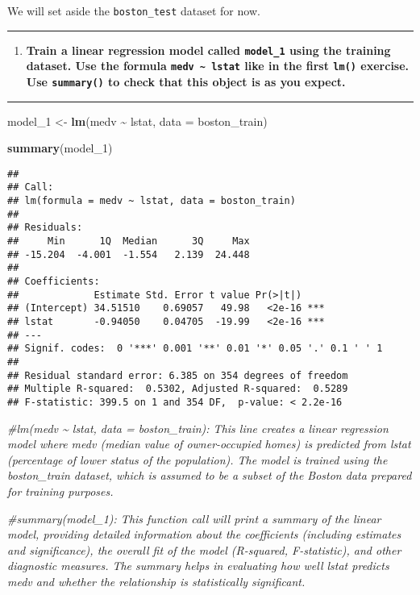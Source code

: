\documentclass[
  12pt,
]{article}
\newenvironment{Shaded}{\begin{snugshade}}{\end{snugshade}}
\newcommand{\AttributeTok}[1]{\textcolor[rgb]{0.13,0.29,0.53}{#1}}
\newcommand{\CommentTok}[1]{\textcolor[rgb]{0.56,0.35,0.01}{\textit{#1}}}
\newcommand{\FunctionTok}[1]{\textcolor[rgb]{0.13,0.29,0.53}{\textbf{#1}}}
\newcommand{\NormalTok}[1]{#1}
\newcommand{\OtherTok}[1]{\textcolor[rgb]{0.56,0.35,0.01}{#1}}
\newcommand{\SpecialCharTok}[1]{\textcolor[rgb]{0.81,0.36,0.00}{\textbf{#1}}}
\providecommand{\tightlist}{%
  \setlength{\itemsep}{0pt}\setlength{\parskip}{0pt}}
\begin{document}
We will set aside the \texttt{boston\_test} dataset for now.

\begin{center}\rule{0.5\linewidth}{0.5pt}\end{center}

\begin{enumerate}
\def\labelenumi{\arabic{enumi}.}
\setcounter{enumi}{11}
\tightlist
\item
  \textbf{Train a linear regression model called \texttt{model\_1} using
  the training dataset. Use the formula
  \texttt{medv\ \textasciitilde{}\ lstat} like in the first
  \texttt{lm()} exercise. Use \texttt{summary()} to check that this
  object is as you expect.}
\end{enumerate}

\begin{center}\rule{0.5\linewidth}{0.5pt}\end{center}

\begin{Shaded}
\begin{Highlighting}[]
\NormalTok{model\_1 }\OtherTok{\textless{}{-}} \FunctionTok{lm}\NormalTok{(medv }\SpecialCharTok{\textasciitilde{}}\NormalTok{ lstat, }\AttributeTok{data =}\NormalTok{ boston\_train)}

\FunctionTok{summary}\NormalTok{(model\_1)}
\end{Highlighting}
\end{Shaded}

\begin{verbatim}
## 
## Call:
## lm(formula = medv ~ lstat, data = boston_train)
## 
## Residuals:
##     Min      1Q  Median      3Q     Max 
## -15.204  -4.001  -1.554   2.139  24.448 
## 
## Coefficients:
##             Estimate Std. Error t value Pr(>|t|)    
## (Intercept) 34.51510    0.69057   49.98   <2e-16 ***
## lstat       -0.94050    0.04705  -19.99   <2e-16 ***
## ---
## Signif. codes:  0 '***' 0.001 '**' 0.01 '*' 0.05 '.' 0.1 ' ' 1
## 
## Residual standard error: 6.385 on 354 degrees of freedom
## Multiple R-squared:  0.5302, Adjusted R-squared:  0.5289 
## F-statistic: 399.5 on 1 and 354 DF,  p-value: < 2.2e-16
\end{verbatim}

\begin{Shaded}
\begin{Highlighting}[]
\CommentTok{\#lm(medv \textasciitilde{} lstat, data = boston\_train): This line creates a linear regression model where medv (median value of owner{-}occupied homes) is predicted from lstat (percentage of lower status of the population). The model is trained using the boston\_train dataset, which is assumed to be a subset of the Boston data prepared for training purposes.}

\CommentTok{\#summary(model\_1): This function call will print a summary of the linear model, providing detailed information about the coefficients (including estimates and significance), the overall fit of the model (R{-}squared, F{-}statistic), and other diagnostic measures. The summary helps in evaluating how well lstat predicts medv and whether the relationship is statistically significant.}
\end{Highlighting}
\end{Shaded}
\end{document}
